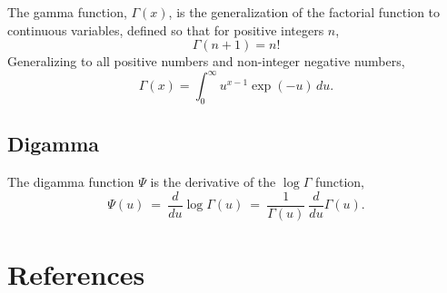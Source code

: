 \documentclass[
  10pt,
]{book}
\begin{document}
The gamma function, \(\Gamma(x)\), is the generalization of the
factorial function to continuous variables, defined so that for
positive integers \(n\), \[ \Gamma(n+1) = n! \] Generalizing to all
positive numbers and non-integer negative numbers, \[ \Gamma(x) =
\int_0^{\infty} u^{x - 1} \exp(-u) \, du. \]

\hypertarget{digamma-appendix}{%
\section{Digamma}\label{digamma-appendix}}

The digamma function \(\Psi\) is the derivative of the \(\log \Gamma\)
function, \[ \Psi(u) \ = \ \frac{d}{d u} \log \Gamma(u) \ = \
\frac{1}{\Gamma(u)} \ \frac{d}{d u} \Gamma(u). \]

\hypertarget{references}{%
\chapter*{References}\label{references}}
\end{document}
